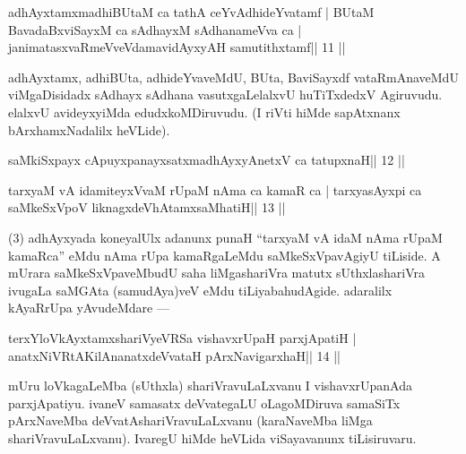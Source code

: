 
\begin{shl}
adhAyxtamxmadhiBUtaM ca tathA ceYvAdhideYvatamf |
BUtaM BavadaBxviSayxM ca sAdhayxM sAdhanameVva ca |
janimatasxvaRmeVveVdamavidAyxyAH samutithxtamf\hfill || 11 ||
\end{shl}

\begin{artha}
adhAyxtamx, adhiBUta, adhideYvaveMdU, BUta, BaviSayxdf vataRmAnaveMdU 
viMgaDisidadx sAdhayx sAdhana vasutxgaLelalxvU huTiTxdedxV Agiruvudu. elalxvU avideyxyiMda edudxkoMDiruvudu. (I riVti hiMde sapAtxnanx bArxhamxNadalilx heVLide).
\end{artha} 
 

\begin{shl}
saMkiSxpayx cApuyxpanayxsatxmadhAyxyAnetxV ca tatupxnaH\hfill || 12 ||
\end{shl}

\begin{shl}
tarxyaM vA idamiteyxVvaM rUpaM nAma ca kamaR ca |
tarxyasAyxpi ca saMkeSxVpoV liknagxdeVhAtamxsaMhatiH\hfill || 13 ||
\end{shl}

\begin{artha}
(3) adhAyxyada koneyalUlx adanunx punaH ``tarxyaM vA idaM nAma rUpaM 
kamaRca'' eMdu nAma rUpa kamaRgaLeMdu saMkeSxVpavAgiyU tiLiside. A mUrara saMkeSxVpaveMbudU saha liMgashariVra matutx sUthxlashariVra ivugaLa saMGAta (samudAya)veV eMdu tiLiyabahudAgide. adaralilx kAyaRrUpa yAvudeMdare  {\rm ---} 
\end{artha}

\begin{shl}
terxYloVkAyxtamxshariVyeVRSa vishavxrUpaH parxjApatiH |
anatxNiVRtAKilAnanatxdeVvataH pArxNavigarxhaH\hfill || 14 ||
\end{shl}

\begin{artha}
mUru loVkagaLeMba (sUthxla) shariVravuLaLxvanu I vishavxrUpanAda 
parxjApatiyu. ivaneV samasatx deVvategaLU oLagoMDiruva samaSiTx pArxNaveMba deVvatAshariVravuLaLxvanu (karaNaveMba liMga shariVravuLaLxvanu). IvaregU hiMde heVLida viSayavanunx tiLisiruvaru.
\end{artha} 
 
 

